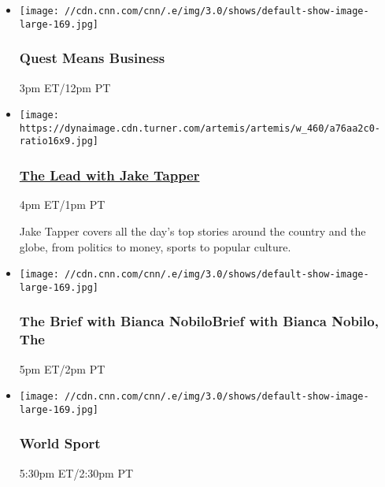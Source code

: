 \begin{itemize}
\item
  \texttt{[image: //cdn.cnn.com/cnn/.e/img/3.0/shows/default-show-image-large-169.jpg]}

  \hypertarget{quest-means-business-4}{%
  \subsubsection{Quest Means Business}\label{quest-means-business-4}}

  3pm ET/12pm PT
\end{itemize}

\begin{itemize}
\item
  \href{/specials/tv/all-shows}{}

  \texttt{[image: https://dynaimage.cdn.turner.com/artemis/artemis/w\_460/a76aa2c0-ratio16x9.jpg]}

  \hypertarget{the-lead-with-jake-tapper-4}{%
  \subsubsection{\texorpdfstring{\href{/specials/tv/all-shows}{The Lead
  with Jake
  Tapper}}{The Lead with Jake Tapper}}\label{the-lead-with-jake-tapper-4}}

  4pm ET/1pm PT

  Jake Tapper covers all the day's top stories around the country and
  the globe, from politics to money, sports to popular culture.
\end{itemize}

\begin{itemize}
\item
  \texttt{[image: //cdn.cnn.com/cnn/.e/img/3.0/shows/default-show-image-large-169.jpg]}

  \hypertarget{the-brief-with-bianca-nobilobrief-with-bianca-nobilo-the--4}{%
  \subsubsection{The Brief with Bianca NobiloBrief with Bianca Nobilo,
  The
  }\label{the-brief-with-bianca-nobilobrief-with-bianca-nobilo-the--4}}

  5pm ET/2pm PT
\end{itemize}

\begin{itemize}
\item
  \texttt{[image: //cdn.cnn.com/cnn/.e/img/3.0/shows/default-show-image-large-169.jpg]}

  \hypertarget{world-sport-18}{%
  \subsubsection{World Sport}\label{world-sport-18}}

  5:30pm ET/2:30pm PT
\end{itemize}

